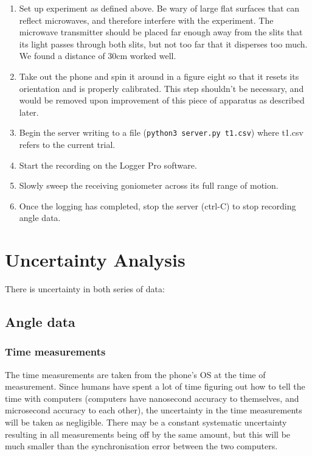 \begin{enumerate}
\item Set up experiment as defined above. Be wary of large flat surfaces that can reflect microwaves, and therefore interfere with the experiment. The microwave transmitter should be placed far enough away from the slits that its light passes through both slits, but not too far that it disperses too much. We found a distance of 30cm worked well.
\item Take out the phone and spin it around in a figure eight so that it resets its orientation and is properly calibrated.
		This step shouldn't be necessary, and would be removed upon improvement of this piece of apparatus as described later.
\item Begin the server writing to a file (\verb|python3 server.py t1.csv|) where t1.csv refers to the current trial.
\item Start the recording on the Logger Pro software.
\item Slowly sweep the receiving goniometer across its full range of motion.
\item Once the logging has completed, stop the server (ctrl-C) to stop recording angle data.
\end{enumerate}

\section*{Uncertainty Analysis}

There is uncertainty in both series of data:

\subsection*{Angle data}

\subsubsection*{Time measurements}

The time measurements are taken from the phone's OS at the time of measurement. Since humans have spent a lot of time figuring out how to tell the time with computers (computers have nanosecond accuracy to themselves, and microsecond accuracy to each other), the uncertainty in the time measurements will be taken as negligible. There may be a constant systematic uncertainty resulting in all measurements being off by the same amount, but this will be much smaller than the synchronisation error between the two computers.

